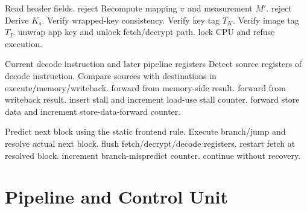 \documentclass[conference]{IEEEtran}
\begin{document}
\begin{algorithm}[!t]
\caption{Validate Image Before Fetch}
\label{alg:validate}
\footnotesize
\begin{algorithmic}[1]
\State Read header fields.
 \State reject \EndIf
\State Recompute mapping $\pi$ and measurement $M'$.
 \State reject \EndIf
\State Derive $K_s$.
\State Verify wrapped-key consistency.
\State Verify key tag $T_K$.
\State Verify image tag $T_I$.
    \State unwrap app key and unlock fetch/decrypt path.
\Else
    \State lock CPU and refuse execution.
\EndIf
\end{algorithmic}
\end{algorithm}

\begin{algorithm}[!t]
\caption{Pipeline Hazard Control}
\label{alg:hazard}
\footnotesize
\begin{algorithmic}[1]
\Require Current decode instruction and later pipeline registers
\State Detect source registers of decode instruction.
\State Compare sources with destinations in execute/memory/writeback.
    \State forward from memory-side result.
    \State forward from writeback result.
    \State insert stall and increment load-use stall counter.
\EndIf
{}
    \State forward store data and increment store-data-forward counter.
\EndIf
\end{algorithmic}
\end{algorithm}

\begin{algorithm}[!t]
\caption{Branch Prediction and Recovery}
\label{alg:branch}
\footnotesize
\begin{algorithmic}[1]
\State Predict next block using the static frontend rule.
\State Execute branch/jump and resolve actual next block.
    \State flush fetch/decrypt/decode registers.
    \State restart fetch at resolved block.
    \State increment branch-mispredict counter.
\Else
    \State continue without recovery.
\EndIf
\end{algorithmic}
\end{algorithm}

\section{Pipeline and Control Unit}
\end{document}
